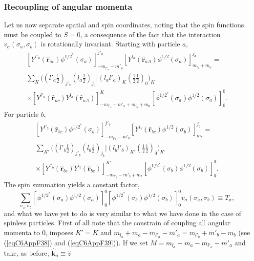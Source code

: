 \subsubsection{Recoupling of angular momenta}
Let us now separate spatial and spin coordinates, noting that the spin functions must be coupled to $S=0$, a consequence of the fact that the  interaction $v_\sigma(\sigma_a,\sigma_b)$ is rotationally invariant. Starting with particle $a$,
\begin{multline}\label{eqC6AppF38}
\left[ Y^{l'_a} (\hat {\mathbf{r}}_{ac})\phi^{1/2^*}(\sigma_a)\right]^{j'_a}_{-m_{l'_a}-m'_a}\left[ Y^{l_a} (\hat {\mathbf{r}}_{aA})\phi^{1/2}(\sigma_a)\right]^{j_a}_{m_{l_a}+m_a}=\\
\sum_K \bigl((l'_a \tfrac{1}{2})_{j'_a}(l_a \tfrac{1}{2})_{j_a}|(l_a l'_a)_K(\tfrac{1}{2} \tfrac{1}{2})_0\bigr)_K\\
\times \left[ Y^{l'_a} (\hat {\mathbf{r}}_{ac})Y^{l_a} (\hat {\mathbf{r}}_{aA})\right]^{K}_{-m_{l'_a}-m'_a+m_{l_a}+m_a}\left[\phi^{1/2^*}(\sigma_a)\phi^{1/2}(\sigma_a)\right]^0_0.
\end{multline}
For particle $b$,
\begin{multline}\label{eqC6AppF39}
\left[ Y^{l'_b} (\hat {\mathbf{r}}_{bc})\phi^{1/2^*}(\sigma_b)\right]^{j'_b}_{-m_{l'_b}-m'_b}\left[ Y^{l_b} (\hat {\mathbf{r}}_{bc})\phi^{1/2}(\sigma_b)\right]^{j_b}_{m_b}=\\
\sum_{K'} \bigl((l'_b \tfrac{1}{2})_{j'_b}(l_b \tfrac{1}{2})_{j_b}|(l_b l'_b)_{K'}(\tfrac{1}{2} \tfrac{1}{2})_0\bigr)_{K'}\\
\times \left[ Y^{l'_b} (\hat {\mathbf{r}}_{bc})Y^{l_b} (\hat {\mathbf{r}}_{bc})\right]^{K'}_{-m_{l'_b}-m'_b+m_b}\left[\phi^{1/2^*}(\sigma_b)\phi^{1/2}(\sigma_b)\right]^0_0.
\end{multline}
The spin summation yields a constant factor,
 \begin{equation}\label{eqC6AppG41}
\sum_{\sigma_a,\sigma_b}\left[\phi^{1/2^*}(\sigma_a)\phi^{1/2}(\sigma_a)\right]^0_0\left[\phi^{1/2^*}(\sigma_b)\phi^{1/2}(\sigma_b)\right]^0_0v_\sigma(\sigma_a,\sigma_b)\equiv T_\sigma,
\end{equation}
and what we have yet to do is very similar to what we have done in the case of spinless particles. First of all note that the constrain of coupling all angular momenta to 0, imposes $K'=K$ and $m_{l_a}+m_a-m_{l'_a}-m'_a=m_{l'_b}+m'_b-m_b$ (see (\ref{eqC6AppF38}) and (\ref{eqC6AppF39})). If we set $M=m_{l_a}+m_a-m_{l'_a}-m'_a$ and take, as before, $\hat {\mathbf{k}}_a\equiv \hat z$
